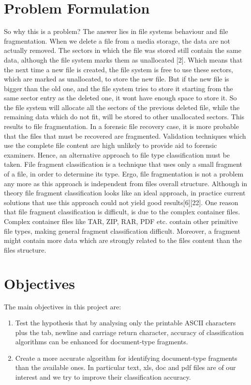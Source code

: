 \section{Problem Formulation}
So why this is a problem? The answer lies in file systems behaviour and
file fragmentation. When we delete a file from a media storage, the data are
not actually removed. The sectors in which the file was stored still contain
the same data, although the file system marks them as unallocated [2]. Which
means that the next time a new file is created, the file system is free to use
these sectors, which are marked as unallocated, to store the new file. But
if the new file is bigger than the old one, and the file system tries to store it
starting from the same sector entry as the deleted one, it wont have enough
space to store it. So the file system will allocate all the sectors of the previous deleted file, while the remaining data which do not fit, will be stored to
other unallocated sectors. This results to file fragmentation. In a forensic
file recovery case, it is more probable that the files that must be recovered are
fragmented. Validation techniques which use the complete file content
are high unlikely to provide aid to forensic examiners. Hence, an alternative
approach to file type classification must be taken.
File fragment classification is a technique that uses only a small fragment
of a file, in order to determine its type. Ergo, file fragmentation is not a
problem any more as this approach is independent from files overall structure. Although in theory file fragment classification looks like an ideal approach, in practice current solutions that use this approach could not yield
good results[6][22]. One reason that file fragment classification is difficult, is
due to the complex container files. Complex container files like TAR, ZIP,
RAR, PDF etc. contain other primitive file types, making general fragment
classification difficult. Moreover, a fragment might contain more data which
are strongly related to the files content than the files structure.

\section{Objectives}
The main objectives in this project are:
\begin{enumerate}
\item Test the hypothesis that by analysing only the printable ASCII characters plus the tab, newline and carriage return  character, accuracy of classification algorithms can be enhanced for document-type fragments.
\item Create a more accurate algorithm for identifying document-type fragments than the available ones. In particular text, xls, doc and pdf files are of our interest and we try to improve their classification accuracy.

\end{enumerate}

